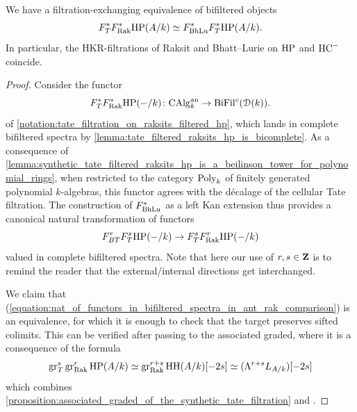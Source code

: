 \documentclass[oneside,a4paper]{amsart}
\begin{document}
\begin{proposition}
\label{proposition:bhattlurie_raksit_hkr_filtrations_on_hcminus_are_equivalent}
We have a filtration-exchanging equivalence of bifiltered objects 
\[
F^*_T F^{\ast}_{\mathrm{Rak}} \mathrm{HP}(A/k) \simeq F^{\ast}_{\mathrm{BhLu}} F^*_T \mathrm{HP}(A/k).
\]
In particular, the HKR-filtrations of Raksit and Bhatt--Lurie on $\mathrm{HP}$ and $\mathrm{HC}^-$ coincide. 
\end{proposition}

\begin{proof}
Consider the functor
\[
F^{\ast}_{T} F^{\ast}_{\mathrm{Rak}} \mathrm{HP}(- / k) \colon \mathrm{CAlg}_{k}^{\mathrm{an}} \rightarrow \mathrm{BiFil}^{c}(\EuScript{D}(k)). 
\]
of \cref{notation:tate_filtration_on_raksits_filtered_hp}, which lands in complete bifiltered spectra by \cref{lemma:tate_filtered_raksits_hp_is_bicomplete}. As a consequence of \cref{lemma:synthetic_tate_filtered_raksits_hp_is_a_beilinson_tower_for_polynomial_rings}, when restricted to the category $\mathrm{Poly}_{k}$ of finitely generated polynomial $k$-algebras, this functor agrees with the d\'{e}calage of the cellular Tate filtration. The construction of $F^{\ast}_{\mathrm{BhLu}}$ as a left Kan extension thus provides a canonical natural transformation of functors 
\begin{equation}
\label{equation:nat_of_functors_in_bifiltered_spectra_in_ant_rak_comparison}
F^{r}_{BT} F^{s}_{T} \mathrm{HP}(- / k) \rightarrow F^{s}_{T} F^{r}_{\mathrm{Rak}} \mathrm{HP}(- / k)
\end{equation}
valued in complete bifiltered spectra. Note that here our use of $r, s \in \mathbf{Z}$ is to remind the reader that the external/internal directions get interchanged. 

We claim that (\ref{equation:nat_of_functors_in_bifiltered_spectra_in_ant_rak_comparison}) is an equivalence, for which it is enough to check that the target preserves sifted colimits. This can be verified after passing to the associated graded, where it is a consequence of the formula 
\[
\operatorname{gr}^{s}_{T} \operatorname{gr}^{r}_{\mathrm{Rak}} \mathrm{HP}(A / k) \simeq \operatorname{gr}^{r+s}_{\mathrm{Rak}} \operatorname{HH}(A / k)[-2s] \simeq (\Lambda^{r+s} L_{A/k})[-2s]
\]
which combines \cref{proposition:associated_graded_of_the_synthetic_tate_filtration} and \cite[{Theorem 6.2.6}]{raksit:2020}. 
\end{proof}



\end{document}
